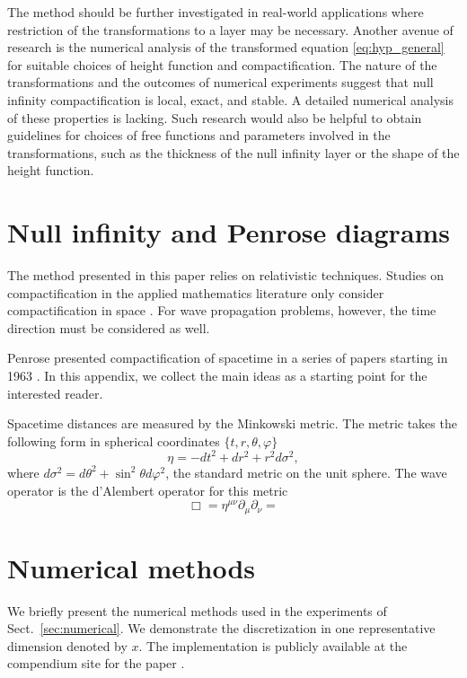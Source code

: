 \documentclass[final,onefignum,onetabnum]{siamart190516}
\begin{document}
The method should be further investigated in real-world applications where restriction of the transformations to a layer may be necessary. Another avenue of research is the numerical analysis of the transformed equation \eqref{eq:hyp_general} for suitable choices of height function and compactification. The nature of the transformations and the outcomes of numerical experiments suggest that null infinity compactification is local, exact, and stable. A detailed numerical analysis of these properties is lacking. Such research would also be helpful to obtain guidelines for choices of free functions and parameters involved in the transformations, such as the thickness of the null infinity layer or the shape of the height function.

\appendix

\section{Null infinity and Penrose diagrams}
The method presented in this paper relies on relativistic techniques. Studies on compactification in the applied mathematics literature only consider compactification in space \cite{GroschOrszag77, boyd1982optimization, shen2009some}. For wave propagation problems, however, the time direction must be considered as well. 

Penrose presented compactification of spacetime in a series of papers starting in 1963 \cite{Penrose, Penrose65}. In this appendix, we collect the main ideas as a starting point for the interested reader. 

Spacetime distances are measured by the Minkowski metric. The metric takes the following form in spherical coordinates $\{t,r,\theta,\varphi\}$
\[ \eta  = -dt^2 + dr^2  + r^2 d\sigma^2, \]
where $d\sigma^2 = d\theta^2 + \sin^2\theta d\varphi^2$, the standard metric on the unit sphere. The wave operator is the d'Alembert operator for this metric
\[ \Box = \eta^{\mu\nu} \partial_\mu \partial_\nu =  \]


\section{Numerical methods}
We briefly present the numerical methods used in the experiments of Sect.~\ref{sec:numerical}. We demonstrate the discretization in one representative dimension denoted by $x$. The implementation is publicly available at the compendium site for the paper \cite{compendium}.
\end{document}
